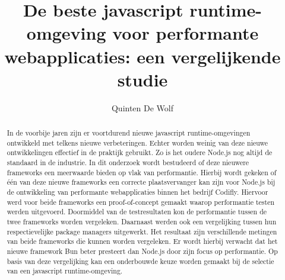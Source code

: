 \documentclass{hogent-article}
\title{De beste javascript runtime-omgeving voor performante webapplicaties: een vergelijkende studie}
\author{Quinten De Wolf}
\begin{document}
\begin{abstract}
  In de voorbije jaren zijn er voortdurend nieuwe javascript runtime-omgevingen ontwikkeld met telkens nieuwe verbeteringen. 
  Echter worden weinig van deze nieuwe ontwikkelingen effectief in de praktijk gebruikt.
  Zo is het oudere Node.js nog altijd de standaard in de industrie. 
  In dit onderzoek wordt bestudeerd of deze nieuwere frameworks een meerwaarde bieden op vlak van performantie. 
  Hierbij wordt gekeken of één van deze nieuwe frameworks  
  een correcte plaatsvervanger kan zijn voor Node.js bij de ontwikkeling van performante webapplicaties binnen het bedrijf Codifly.
  Hiervoor werd voor beide frameworks een proof-of-concept gemaakt waarop performantie testen werden uitgevoerd.
  Doormiddel van de testresultaten kon de performantie tussen de twee frameworks worden vergeleken.
  Daarnaast werden ook een vergelijking tussen hun respectievelijke package managers uitgewerkt. 
  Het resultaat zijn verschillende metingen van beide frameworks die kunnen worden vergeleken.
  Er wordt hierbij verwacht dat het nieuwe framework Bun beter presteert dan Node.js door zijn focus op performantie.
  Op basis van deze vergelijking kan een onderbouwde keuze worden gemaakt bij de selectie van een javascript runtime-omgeving.

\end{abstract}

\tableofcontents



\printbibliography[heading=bibintoc]
\end{document}
